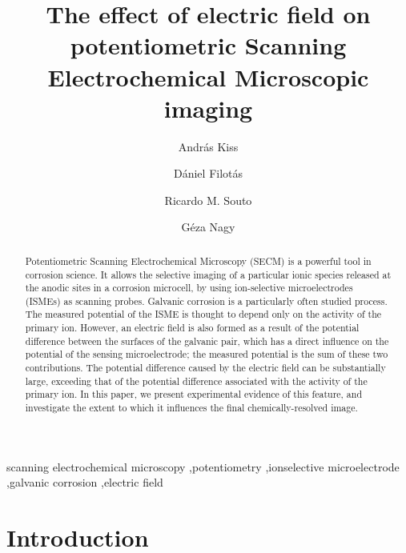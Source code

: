 \documentclass[3p]{elsarticle}
\begin{document}
\begin{frontmatter}

\title{The effect of electric field on potentiometric Scanning Electrochemical Microscopic imaging}
\author[akiss]{András Kiss}
\address[akiss, gnagy]{Department of General and Physical Chemistry, Faculty of Sciences, University of Pécs, 7624 Pécs, Ifjúság útja 6, Hungary}
\address[rmsouto]{Department Chemistry, Universidad de La Laguna, P.O. Box 456, E-38200 La Laguna (Tenerife), Spain}
\author[dfilotas]{Dániel Filotás}
\author[rmsouto]{Ricardo M. Souto}
\author[gnagy]{Géza Nagy}


\begin{abstract}

Potentiometric Scanning Electrochemical Microscopy (SECM) is a powerful tool in corrosion science.
It allows the selective imaging of a particular ionic species released at the anodic sites in a corrosion microcell, by using ion-selective microelectrodes (ISMEs) as scanning probes. Galvanic corrosion is a particularly often studied process.
The measured potential of the ISME is thought to depend only on the activity of the primary ion.
However, an electric field is also formed as a result of the potential difference between the surfaces of the galvanic pair, which has a direct influence on the potential of the sensing microelectrode; the measured potential is the sum of these two contributions.
The potential difference caused by the electric field can be substantially large, exceeding that of the potential difference associated with the activity of the primary ion.
In this paper, we present experimental evidence of this feature, and investigate the extent to which it influences the final chemically-resolved image. 
\end{abstract}
\begin{keyword}
	scanning electrochemical microscopy \sep potentiometry \sep ionselective microelectrode \sep galvanic corrosion \sep electric field
\end{keyword}
\end{frontmatter}

\section{Introduction}
\end{document}
